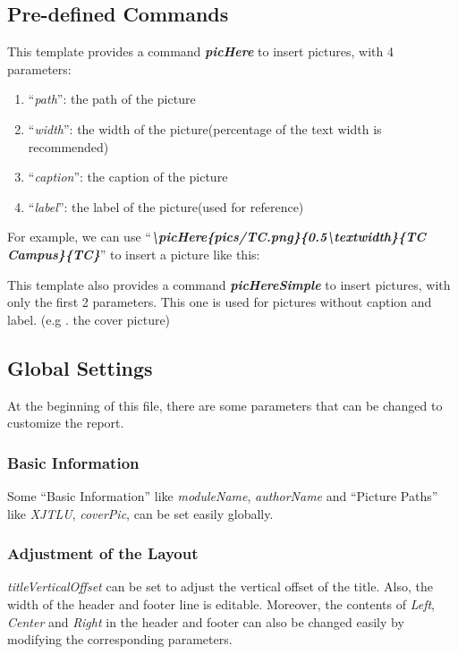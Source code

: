 \documentclass{article}
\begin{document}
\subsection{Pre-defined Commands}
\noindent This template provides a command \textit{\textbf{picHere}} to insert pictures, with 4 parameters:
\begin{enumerate}
    \item ``\textit{path}'': the path of the picture
    \item ``\textit{width}'': the width of the picture(percentage of the text width is recommended)
    \item ``\textit{caption}'': the caption of the picture
    \item ``\textit{label}'': the label of the picture(used for reference)
\end{enumerate}

\noindent For example, we can use ``\textit{\textbf{\textbackslash picHere\{pics/TC.png\}\{0.5\textbackslash textwidth\}\{TC Campus\}\{TC\}}}'' to insert a picture like this:

This template also provides a command \textit{\textbf{picHereSimple}} to insert pictures, 
with only the first 2 parameters. 
This one is used for pictures without caption and label. (e.g . the cover picture)

\subsection{Global Settings}
At the beginning of this file, there are some parameters that can be changed to customize the report. 
\subsubsection{Basic Information}
Some ``Basic Information'' like \textit{moduleName}, \textit{authorName} and ``Picture Paths'' like \textit{XJTLU}, \textit{coverPic}, 
can be set easily globally. 

\subsubsection{Adjustment of the Layout}
\textit{titleVerticalOffset} can be set to adjust the vertical offset of the title.
Also, the width of the header and footer line is editable. 
Moreover, the contents of \textit{Left}, \textit{Center} and \textit{Right} in the header and footer can also be changed easily by modifying the corresponding parameters.
\end{document}
